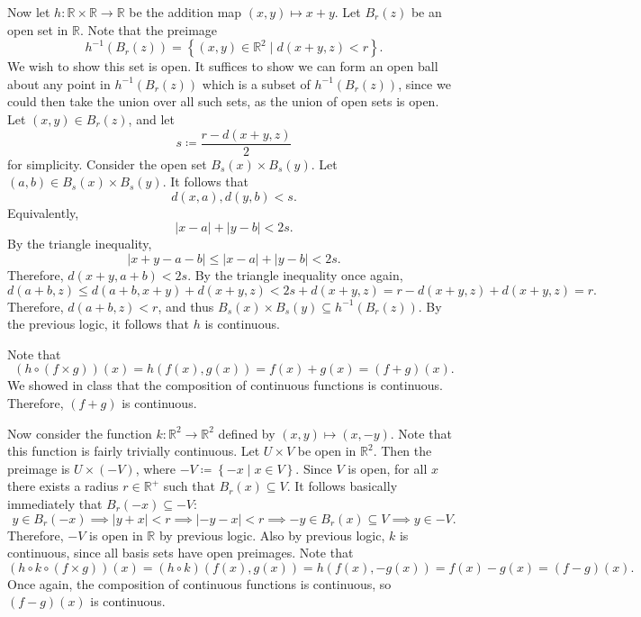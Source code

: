 \documentclass[11pt, letterpaper]{article}
\begin{document}
Now let $h : \mathbb{R} \times \mathbb{R}  \to \mathbb{R} $ be the addition map $(x,y)\mapsto x+y$. Let $B_r(z)$ be an open set in $\mathbb{R} $. Note that the preimage
\[
	h^{-1} \left( B_r\left( z \right)  \right) =\left\{ (x,y)\in\mathbb{R} ^2\mid d(x+y,z)<r \right\} 
.\]
We wish to show this set is open. It suffices to show we can form an open ball about any point in $h^{-1} \left( B_r\left( z \right)  \right) $ which is a subset of $h^{-1} \left( B_r(z) \right) $, since we could then take the union over all such sets, as the union of open sets is open. Let $(x,y)\in B_r(z)$, and let
\[
	s\coloneqq \frac{r-d(x+y,z)}{2} 
\]
for simplicity. Consider the open set $B_s(x)\times B_s(y)$. Let $(a,b)\in B_s(x)\times B_s(y)$. It follows that
\[
	d(x,a),d(y,b)<s
.\]
Equivalently,
\[
	\left| x-a \right| +\left| y-b \right| <2s
.\]
By the triangle inequality,
\[
	\left| x+y-a-b \right| \leq \left| x-a \right| +\left| y-b \right| <2s
.\]
Therefore, $d(x+y,a+b)<2s$. By the triangle inequality once again,
\[
	d(a+b,z)\leq d(a+b,x+y)+d(x+y,z)<2s+d(x+y,z)=r-d(x+y,z)+d(x+y,z)=r
.\]
Therefore, $d(a+b,z)<r$, and thus $B_s(x)\times B_s(y)\subseteq h^{-1} \left( B_r(z) \right) $. By the previous logic, it follows that $h$ is continuous.

Note that
\[
	(h\circ (f\times g))(x)=h(f(x),g(x))=f(x)+g(x)=(f+g)(x)
.\]
We showed in class that the composition of continuous functions is continuous. Therefore, $(f+g)$ is continuous.

Now consider the function $k : \mathbb{R} ^2 \to \mathbb{R} ^2$ defined by $(x,y)\mapsto (x,-y)$. Note that this function is fairly trivially continuous. Let $U\times V$ be open in $\mathbb{R} ^2$. Then the preimage is $U\times (-V)$, where $-V\coloneqq \left\{ -x\mid x\in V \right\} $. Since $V$ is open, for all $x$ there exists a radius $r\in\mathbb{R} ^+$ such that $B_r(x)\subseteq V$. It follows basically immediately that $B_r(-x)\subseteq -V$:
\[
	y\in B_r(-x)\implies \left| y+x \right| <r \implies \left| -y-x \right| <r\implies -y\in B_r(x) \subseteq V \implies y\in -V
.\]
Therefore, $-V$ is open in $\mathbb{R} $ by previous logic. Also by previous logic, $k$ is continuous, since all basis sets have open preimages. Note that
\[
	(h\circ k\circ (f\times g))(x)=(h\circ k)(f(x),g(x))=h(f(x),-g(x))=f(x)-g(x)=(f-g)(x)
.\]
Once again, the composition of continuous functions is continuous, so $(f-g)(x)$ is continuous.
\end{document}

